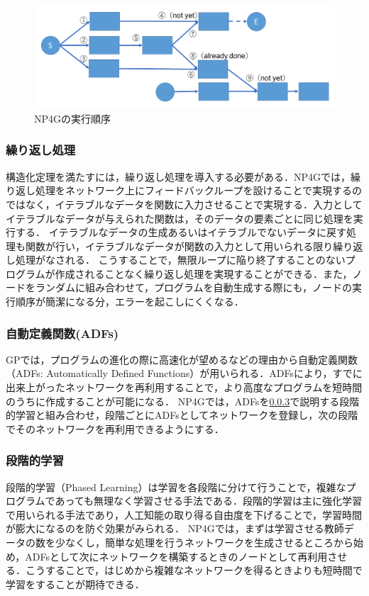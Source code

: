 \documentclass[exploratorypaper]{jsaiart} %
\begin{document}
\begin{figure}[t]
    \begin{center}
        \includegraphics[width=130mm]{sequence.png}
    \end{center}
    \capwidth=90mm %
    \caption{NP4Gの実行順序}
    \label{fig:sequence}
\end{figure}

\subsubsection{繰り返し処理}
構造化定理を満たすには，繰り返し処理を導入する必要がある．NP4Gでは，繰り返し処理をネットワーク上にフィードバックループを設けることで実現するのではなく，イテラブルなデータを関数に入力させることで実現する．入力としてイテラブルなデータが与えられた関数は，そのデータの要素ごとに同じ処理を実行する．
イテラブルなデータの生成あるいはイテラブルでないデータに戻す処理も関数が行い，イテラブルなデータが関数の入力として用いられる限り繰り返し処理がなされる．
こうすることで，無限ループに陥り終了することのないプログラムが作成されることなく繰り返し処理を実現することができる．また，ノードをランダムに組み合わせて，プログラムを自動生成する際にも，ノードの実行順序が簡潔になる分，エラーを起こしにくくなる．

\subsubsection{自動定義関数(ADFs)}
GPでは，プログラムの進化の際に高速化が望めるなどの理由から自動定義関数（ADFs: Automatically Defined Functions）が用いられる\cite{adfs}．ADFsにより，すでに出来上がったネットワークを再利用することで，より高度なプログラムを短時間のうちに作成することが可能になる．
NP4Gでは，ADFsを\ref{sec:PL}で説明する段階的学習と組み合わせ，段階ごとにADFsとしてネットワークを登録し，次の段階でそのネットワークを再利用できるようにする．

\subsubsection{段階的学習}
\label{sec:PL}
段階的学習（Phased Learning）は学習を各段階に分けて行うことで，複雑なプログラムであっても無理なく学習させる手法である．段階的学習は主に強化学習で用いられる手法であり，人工知能の取り得る自由度を下げることで，学習時間が膨大になるのを防ぐ効果がみられる\cite{hodohara2012reinforcement}．
NP4Gでは，まずは学習させる教師データの数を少なくし，簡単な処理を行うネットワークを生成させるところから始め，ADFsとして次にネットワークを構築するときのノードとして再利用させる．こうすることで，はじめから複雑なネットワークを得るときよりも短時間で学習をすることが期待できる．
\end{document}
